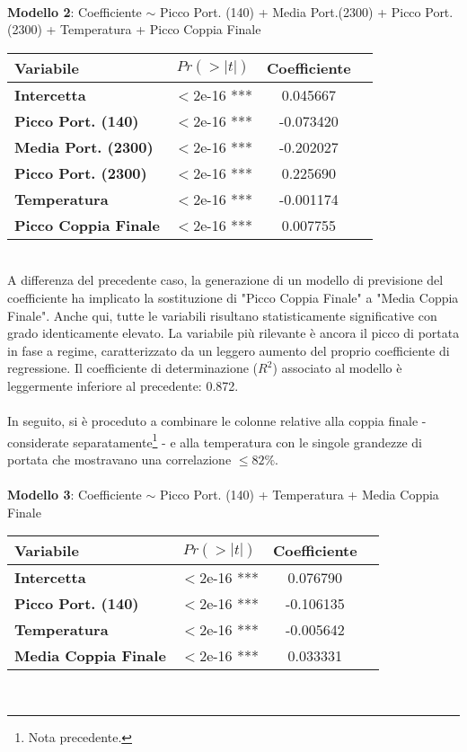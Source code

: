 \documentclass[fleqn,10pt]{SelfArx} %
\begin{document}
\\
\textbf{Modello 2}: Coefficiente $\sim$  Picco Port. (140) + Media Port.(2300) + Picco Port. (2300) + Temperatura + Picco Coppia Finale
{\begin{table}[h] 
\centering
\begin{tabular}[t]{lccc}
\toprule 
Variabile&$Pr(> |t|)$&Coefficiente\\
\midrule 
\textbf{Intercetta}&$<$2e-16 ***&0.045667\\ 
\textbf{Picco Port. (140)}&$<$2e-16 ***&-0.073420\\ 
\textbf{Media Port. (2300)}&$<$2e-16 ***&-0.202027\\ 
\textbf{Picco Port. (2300)}&$<$2e-16 ***&0.225690\\ 
\textbf{Temperatura}&$<$2e-16 ***&-0.001174\\
\textbf{Picco Coppia Finale}&$<$2e-16 ***&0.007755\\
\bottomrule 
\end{tabular}
\end{table}}\\
A differenza del precedente caso, la generazione di un modello di previsione del coefficiente ha implicato la sostituzione di "Picco Coppia Finale" a "Media Coppia Finale". Anche qui, tutte le variabili risultano statisticamente significative con grado identicamente elevato. La variabile più rilevante è ancora il picco di portata in fase a regime, caratterizzato da un leggero aumento del proprio coefficiente di regressione. Il coefficiente di determinazione ($R^2$) associato al modello è leggermente inferiore al precedente: 0.872.\\
\\
In seguito, si è proceduto a combinare le colonne relative alla coppia finale - considerate separatamente\footnote{Nota precedente.} - e alla temperatura con le singole grandezze di portata che mostravano una correlazione $\leq 82\%$.\\
\\
\textbf{Modello 3}: Coefficiente $\sim$  Picco Port. (140) + Temperatura + Media Coppia Finale
{\begin{table}[h] 
\centering
\begin{tabular}[t]{lccc}
\toprule 
Variabile&$Pr(> |t|)$&Coefficiente\\
\midrule 
\textbf{Intercetta}&$<$2e-16 ***&0.076790\\ 
\textbf{Picco Port. (140)}&$<$2e-16 ***&-0.106135\\
\textbf{Temperatura}&$<$2e-16 ***&-0.005642\\
\textbf{Media Coppia Finale}&$<$2e-16 ***&0.033331\\
\bottomrule 
\end{tabular}
\end{table}}\\
\end{document}
